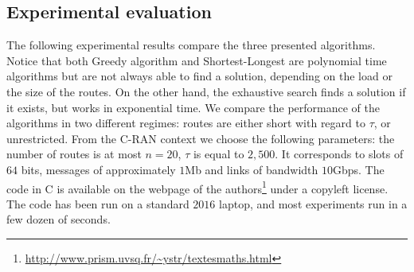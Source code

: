 \documentclass[10pt, conference, letterpaper]{IEEEtran}
\begin{document}
%        
%        
%        
%       
   
   
   
   \subsection{Experimental evaluation}\label{sec:exp_PAZL}
      The following experimental results compare the three presented algorithms.
      Notice that both Greedy algorithm and Shortest-Longest are polynomial time algorithms but are not always able to find a solution, depending on the load or the size of the routes. On the other hand, the exhaustive search finds a solution if it exists, but works in exponential time. We compare the performance of the algorithms in two different regimes: routes are either short with regard to $\tau$, or unrestricted.
      From the C-RAN context we choose the following parameters: the number of routes is at most $n = 20$, $\tau$ is equal to $2,500$.
      It corresponds to slots of $64$ bits, messages of approximately $1$Mb and links of bandwidth $10$Gbps.
       The code in C is available on the webpage of the authors\footnote{\url{http://www.prism.uvsq.fr/~ystr/textesmaths.html}} under a copyleft license. The code has been run on a standard $2016$ laptop, and most experiments run in a few dozen of seconds.
\end{document}
